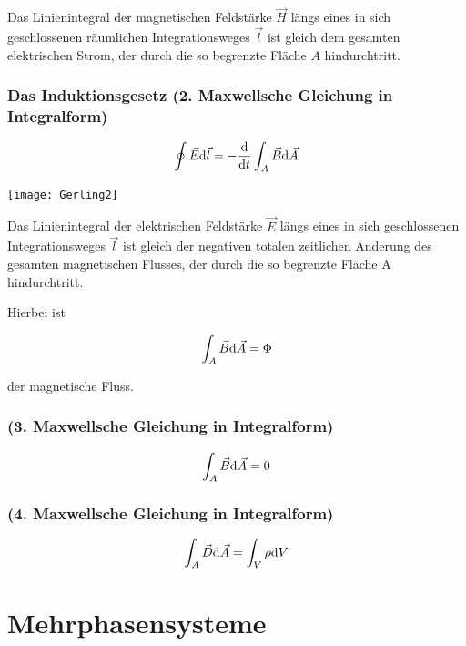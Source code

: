 Das Linienintegral der magnetischen Feldstärke $\vec{H}$ längs eines in sich geschlossenen räumlichen Integrationsweges $\vec{l}$ ist gleich dem gesamten elektrischen Strom, der durch die so begrenzte Fläche $A$ hindurchtritt.

\subsubsection{Das Induktionsgesetz (2. Maxwellsche Gleichung in Integralform)}

\begin{minipage}{0.5\textwidth}
\begin{align}
	\oint \vec{E}\mathrm{d}\vec{l} = -\frac{\mathrm{d}}{\mathrm{d}t}\int_A \vec{B}\mathrm{d}\vec{A}
\end{align}
\end{minipage}
\begin{minipage}{0.5\textwidth}
	\texttt{[image: Gerling2]}
\end{minipage}


Das Linienintegral der elektrischen Feldstärke $\vec{E}$ längs eines in sich geschlossenen Integrationsweges $\vec{l}$ ist gleich der negativen totalen zeitlichen Änderung des gesamten magnetischen Flusses, der durch die so begrenzte Fläche A hindurchtritt.

Hierbei ist

\begin{align}
\int_A \vec{B}\mathrm{d}\vec{A} = \Phi
\end{align}

der magnetische Fluss.

\subsubsection{(3. Maxwellsche Gleichung in Integralform)}

\begin{align}
\int_A \vec{B}\mathrm{d}\vec{A} = 0
\end{align}

\subsubsection{(4. Maxwellsche Gleichung in Integralform)}

\begin{align}
\int_A \vec{D}\mathrm{d}\vec{A} = \int_V\rho\mathrm{d}V
\end{align}

\section{Mehrphasensysteme}
\label{subsec:mehrphasensysteme}

